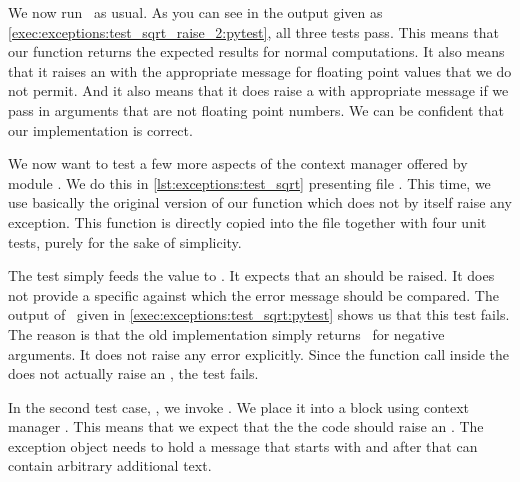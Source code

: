 %
We now run \pytest\ as usual.
As you can see in the output given as \cref{exec:exceptions:test_sqrt_raise_2:pytest}, all three tests pass.
This means that our  function returns the expected results for normal computations.
It also means that it raises an  with the appropriate message for floating point values that we do not permit.
And it also means that it does raise a  with appropriate message if we pass in arguments that are not floating point numbers.
We can be confident that our implementation is correct.

%
%
%
%
%
%
We now want to test a few more aspects of the  context manager offered by module .
We do this in \cref{lst:exceptions:test_sqrt} presenting file .
This time, we use basically the original version of our  function which does not by itself raise any exception.
This  function is directly copied into the file together with four unit tests, purely for the sake of simplicity.

The test  simply feeds the value  to .
It expects that an  should be raised.
It does not provide a specific   against which the error message should be compared.
The output of \pytest\ given in \cref{exec:exceptions:test_sqrt:pytest} shows us that this test fails.
The reason is that the old implementation  simply returns~ for negative arguments.
It does not raise any error explicitly.
Since the function call inside the  does not actually raise an , the test fails.

In the second test case, , we invoke .
We place it into a  block using context manager .
This means that we expect that the the code should raise an .
The exception object needs to hold a message that starts with  and after that can contain arbitrary additional text.

